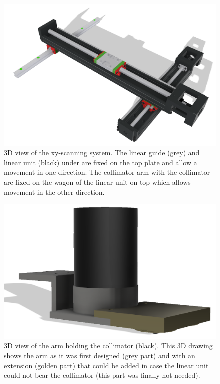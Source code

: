 \documentclass[11pt,a4paper]{article}
\begin{document}
\begin{figure}[!h]
\centering
\includegraphics[scale=0.4]{position.png}
\caption{3D view of the xy-scanning system. The linear guide (grey) and linear unit (black) under are fixed on the top plate and allow a movement in one direction. The collimator arm with the collimator are fixed on the wagon of the linear unit on top which allows movement in the other direction.}
\label{scan}
\end{figure}

\begin{figure}[!h]
\centering
\includegraphics[scale=0.4]{Arm.png}
\caption{3D view of the arm holding the collimator (black). This 3D drawing shows the arm as it was first designed (grey part) and with an extension (golden part) that could be added in case the linear unit could not bear the collimator (this part was finally not needed).}
\label{arm}
\end{figure}
\end{document}
